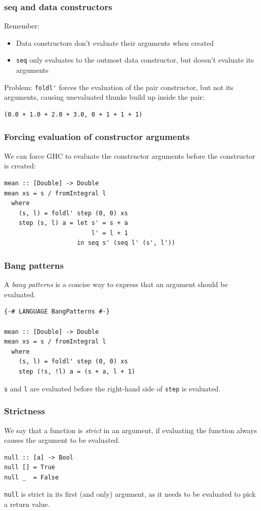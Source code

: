 \documentclass{beamer}
\begin{document}
\begin{frame}[fragile]
  \frametitle{seq and data constructors}

  Remember:
  \begin{itemize}
  \item Data constructors don't evaluate their arguments when
    created
  \item \lstinline!seq! only evaluates to the outmost data
    constructor, but doesn't evaluate its arguments
  \end{itemize}

  Problem: \lstinline!foldl'! forces the evaluation of the pair
  constructor, but not its arguments, causing unevaluated thunks build
  up inside the pair:

\begin{verbatim}
(0.0 + 1.0 + 2.0 + 3.0, 0 + 1 + 1 + 1)
\end{verbatim}
\end{frame}

\begin{frame}[fragile]
  \frametitle{Forcing evaluation of constructor arguments}

  We can force GHC to evaluate the constructor arguments before the
  constructor is created:

  \begin{lstlisting}
mean :: [Double] -> Double
mean xs = s / fromIntegral l
  where
    (s, l) = foldl' step (0, 0) xs
    step (s, l) a = let s' = s + a
                        l' = l + 1
                    in seq s' (seq l' (s', l'))
  \end{lstlisting}
\end{frame}

\begin{frame}[fragile]
  \frametitle{Bang patterns}

  A \emph{bang patterns} is a concise way to express that an argument
  should be evaluated.

  \begin{lstlisting}
{-# LANGUAGE BangPatterns #-}

mean :: [Double] -> Double
mean xs = s / fromIntegral l
  where
    (s, l) = foldl' step (0, 0) xs
    step (!s, !l) a = (s + a, l + 1)
  \end{lstlisting}

  \lstinline!s! and \lstinline!l! are evaluated before the right-hand
  side of \lstinline!step! is evaluated.
\end{frame}

\begin{frame}[fragile]
  \frametitle{Strictness}

  We say that a function is \emph{strict} in an argument, if
  evaluating the function always causes the argument to be evaluated.

  \begin{lstlisting}
null :: [a] -> Bool
null [] = True
null _  = False
  \end{lstlisting}

  \lstinline!null! is strict in its first (and only) argument, as it
  needs to be evaluated to pick a return value.
\end{frame}
\end{document}
